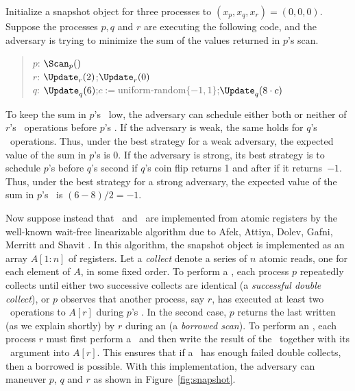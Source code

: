 \documentclass[11pt,letterpaper]{article}
\begin{document}
Initialize a snapshot object for three processes to $(x_p,x_q,x_r) = (0,0,0)$.
Suppose the processes $p,q$ and $r$ are executing the following code,
and the adversary is trying to minimize the sum of the values returned in $p$'s scan.

\begin{quote}
\medskip
\noindent
$p$:  $\Scan_p()$  \\
$r$:  $\Update_r(2)$;\quad  $\Update_r(0)$\\
$q$:  $\Update_q(6)$;\quad  $c :=$uniform-random$\{-1,1\}$;\quad $\Update_q(8 \cdot c)$
\end{quote}
\medskip

To keep the sum in $p$'s \Scan\ low,
the adversary can schedule either both or neither of $r$'s \Update\ operations before $p$'s \Scan.
If the adversary is weak, the same holds for $q$'s \Update\ operations.
Thus, under the best strategy for a weak adversary, the expected value of the sum in $p$'s \Scan is 0.
If the adversary is strong,
its best strategy is to schedule $p$'s \Scan before $q$'s second \Update if $q$'s coin flip returns 1
and after if it returns~$-1$.
Thus, under the best strategy for a strong adversary, the expected value
of the sum in $p$'s \Scan\ is $(6-8)/2=-1$.

Now suppose instead that \Update\ and \Scan\ are implemented from atomic registers
by the well-known wait-free linearizable algorithm due to Afek, Attiya, Dolev, Gafni, Merritt and Shavit \cite{aadgms:snapshots}.
In this algorithm, the snapshot object is implemented as an array $A[1:n]$ of registers.
Let a \emph{collect} denote a series of $n$ atomic reads, one for each element of $A$, in some fixed order.
To perform a \Scan, each process $p$ repeatedly collects until either two successive collects are
identical (a \emph{successful double collect}),
or $p$ observes that another process, say $r$, has executed at least two \Update\ operations to $A[r]$ during $p$'s \Scan.
In the second case, $p$ returns the last \Scan written (as we explain shortly) by $r$ during an \Update (a \emph{borrowed scan}).
To perform an \Update, each process $r$ must first perform a \Scan\ and then write the result of the \Scan\
together with its \Update\ argument into $A[r]$.
This ensures that if a \Scan\ has enough failed double collects, then a borrowed \Scan is possible.
With this implementation, the adversary can maneuver $p$, $q$ and $r$ as shown in Figure~\ref{fig:snapshot}.
\end{document}
